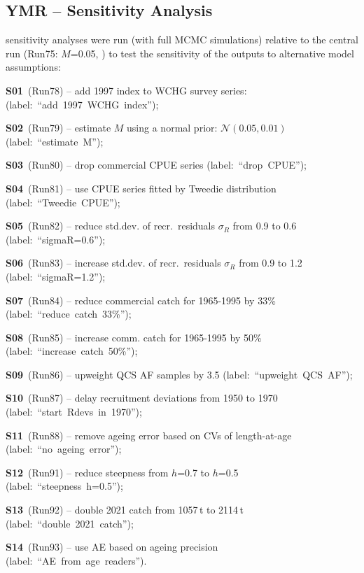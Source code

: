\documentclass[11pt]{book}
\newcommand{\pc}{\%}
\begin{document}
\subsection{YMR -- Sensitivity Analysis}\label{ss:sensruns} 


 sensitivity analyses were run (with full MCMC simulations) relative to the central run (Run75: $M$=0.05, ) to test the sensitivity of the outputs to alternative model assumptions:
\begin{itemize_csas}{}{}
  \item \textbf{S01}~(Run78)  -- add 1997 index to WCHG survey series: (label:~``add~1997~WCHG~index'');
  \item \textbf{S02}~(Run79)  -- estimate $M$ using a normal prior: $\mathcal{N}(0.05,0.01)$ (label:~``estimate~M'');
  \item \textbf{S03}~(Run80)  -- drop commercial CPUE series  (label:~``drop~CPUE'');
  \item \textbf{S04}~(Run81)  -- use CPUE series fitted by Tweedie distribution (label:~``Tweedie~CPUE'');
  \item \textbf{S05}~(Run82)  -- reduce std.dev. of recr.~residuals $\sigma_R$ from 0.9 to 0.6  (label:~``sigmaR=0.6'');
  \item \textbf{S06}~(Run83)  -- increase std.dev. of recr.~residuals $\sigma_R$ from 0.9 to 1.2 (label:~``sigmaR=1.2'');
  \item \textbf{S07}~(Run84)  -- reduce commercial catch for 1965-1995 by 33\pc{} (label:~``reduce~catch~33\pc'');
  \item \textbf{S08}~(Run85)  -- increase comm. catch for 1965-1995 by 50\pc{} (label:~``increase~catch~50\pc'');
  \item \textbf{S09}~(Run86)  -- upweight QCS AF samples by 3.5 (label:~``upweight~QCS~AF'');
  \item \textbf{S10}~(Run87) -- delay recruitment deviations from 1950 to 1970 (label:~``start~Rdevs~in~1970'');
  \item \textbf{S11}~(Run88) -- remove ageing error based on CVs of length-at-age (label:~``no~ageing~error'');
  \item \textbf{S12}~(Run91) -- reduce steepness from $h$=0.7 to $h$=0.5 (label:~``steepness~h=0.5'');
  \item \textbf{S13}~(Run92) -- double 2021 catch from 1057\,t to 2114\,t (label:~``double~2021~catch'');
  \item \textbf{S14}~(Run93) -- use AE based on ageing precision (label:~``AE~from~age~readers'').
\end{itemize_csas}
\end{document}
